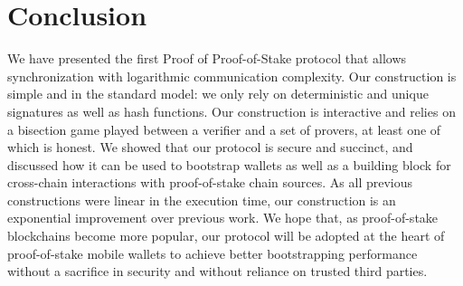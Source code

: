 \section{Conclusion}

We have presented the first Proof of Proof-of-Stake protocol that allows synchronization
with logarithmic communication complexity. Our construction is simple and in the standard
model: we only rely on deterministic and unique signatures as well as hash functions. Our
construction is interactive and relies on a bisection game played between a verifier and
a set of provers, at least one of which is honest. We showed that our protocol is secure
and succinct, and discussed how it can be used to bootstrap wallets as well as a building
block for cross-chain interactions with proof-of-stake chain sources. As all previous
constructions were linear in the execution time, our construction is an exponential
improvement over previous work. We hope that, as proof-of-stake blockchains become
more popular, our protocol will be adopted at the heart of proof-of-stake mobile wallets
to achieve better bootstrapping performance without a sacrifice in security and without
reliance on trusted third parties.
